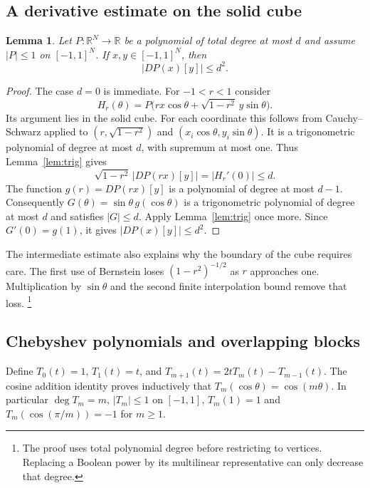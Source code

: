 \documentclass[11pt,reqno]{amsart}
\newtheorem{lemma}[theorem]{Lemma}
\theoremstyle{definition}
\theoremstyle{remark}
\newcommand{\R}{\mathbb R}
\numberwithin{equation}{section}
\begin{document}
\subsection{A derivative estimate on the solid cube}

\begin{lemma}\label{lem:banach-markov}
Let $P\colon\R^N\to\R$ be a polynomial of total degree at most $d$
and assume $|P|\le1$ on $[-1,1]^N$. If $x,y\in[-1,1]^N$, then
\begin{equation}\label{eq:cube-markov}
 |DP(x)[y]|\le d^2.
\end{equation}
\end{lemma}

\begin{proof}
The case $d=0$ is immediate. For $-1<r<1$ consider
\[
 H_r(\theta)=P\bigl(rx\cos\theta+\sqrt{1-r^2}\,y\sin\theta\bigr).
\]
Its argument lies in the solid cube. For each coordinate this follows
from Cauchy--Schwarz applied to $(r,\sqrt{1-r^2})$ and
$(x_i\cos\theta,y_i\sin\theta)$. It is a trigonometric polynomial
of degree at most $d$, with supremum at most one. Thus
Lemma~\ref{lem:trig} gives
\[
 \sqrt{1-r^2}\,|DP(rx)[y]|=|H_r'(0)|\le d.
\]
The function $g(r)=DP(rx)[y]$ is a polynomial of degree at most $d-1$.
Consequently $G(\theta)=\sin\theta\,g(\cos\theta)$ is a
trigonometric polynomial of degree at most $d$ and satisfies $|G|\le d$.
Apply Lemma~\ref{lem:trig} once more. Since $G'(0)=g(1)$, it gives
$|DP(x)[y]|\le d^2$.
\end{proof}

The intermediate estimate also explains why the boundary of the cube
requires care. The first use of Bernstein loses
$(1-r^2)^{-1/2}$ as $r$ approaches one. Multiplication by
$\sin\theta$ and the second finite interpolation bound remove that loss.
\footnote{The proof uses total polynomial degree before restricting to
vertices. Replacing a Boolean power by its multilinear representative
can only decrease that degree.}

\subsection{Chebyshev polynomials and overlapping blocks}

Define $T_0(t)=1$, $T_1(t)=t$, and
$T_{m+1}(t)=2tT_m(t)-T_{m-1}(t)$.
The cosine addition identity proves inductively that
$T_m(\cos\theta)=\cos(m\theta)$.
In particular $\deg T_m=m$, $|T_m|\le1$ on $[-1,1]$,
$T_m(1)=1$ and $T_m(\cos(\pi/m))=-1$ for $m\ge1$.
\end{document}

